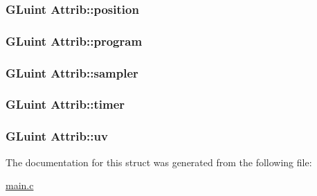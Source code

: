 \subsubsection[{\texorpdfstring{position}{position}}]{\setlength{\rightskip}{0pt plus 5cm}G\+Luint Attrib\+::position}\hypertarget{structAttrib_a2e8900e46275e6dba5de47a6cb3fb014}{}\label{structAttrib_a2e8900e46275e6dba5de47a6cb3fb014}
\subsubsection[{\texorpdfstring{program}{program}}]{\setlength{\rightskip}{0pt plus 5cm}G\+Luint Attrib\+::program}\hypertarget{structAttrib_accbe71d8cd2e04669694902abddf88fd}{}\label{structAttrib_accbe71d8cd2e04669694902abddf88fd}
\subsubsection[{\texorpdfstring{sampler}{sampler}}]{\setlength{\rightskip}{0pt plus 5cm}G\+Luint Attrib\+::sampler}\hypertarget{structAttrib_ab176427e061e47c040d0a8d25488fd6d}{}\label{structAttrib_ab176427e061e47c040d0a8d25488fd6d}
\subsubsection[{\texorpdfstring{timer}{timer}}]{\setlength{\rightskip}{0pt plus 5cm}G\+Luint Attrib\+::timer}\hypertarget{structAttrib_aa27da229009adea9e3729e80f7b200b5}{}\label{structAttrib_aa27da229009adea9e3729e80f7b200b5}
\subsubsection[{\texorpdfstring{uv}{uv}}]{\setlength{\rightskip}{0pt plus 5cm}G\+Luint Attrib\+::uv}\hypertarget{structAttrib_a91a6c5203f836990dfd2529a4dd128ce}{}\label{structAttrib_a91a6c5203f836990dfd2529a4dd128ce}


The documentation for this struct was generated from the following file\+:\begin{DoxyCompactItemize}
\item 
\hyperlink{main_8c}{main.\+c}\end{DoxyCompactItemize}
